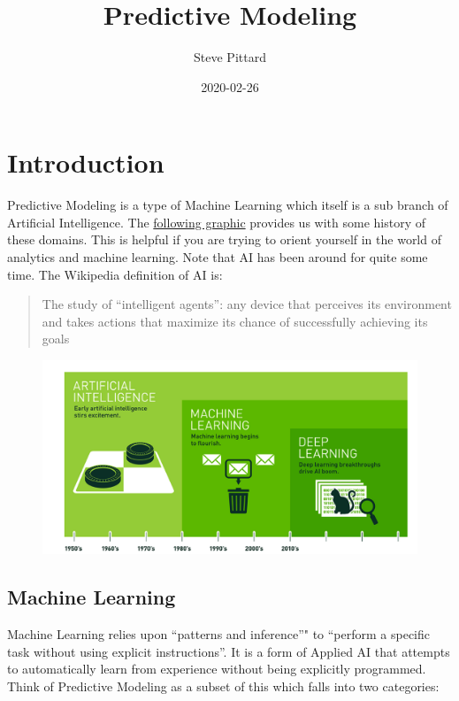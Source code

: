 \documentclass[]{book}
\title{Predictive Modeling}
\author{Steve Pittard}
\date{2020-02-26}
\begin{document}
\maketitle

{
\setcounter{tocdepth}{1}
\tableofcontents
}
\chapter{Introduction}\label{intro}

Predictive Modeling is a type of Machine Learning which itself is a sub
branch of Artificial Intelligence. The
\href{https://blogs.nvidia.com/blog/2016/07/29/whats-difference-artificial-intelligence-machine-learning-deep-learning-ai/}{following
graphic} provides us with some history of these domains. This is helpful
if you are trying to orient yourself in the world of analytics and
machine learning. Note that AI has been around for quite some time. The
Wikipedia definition of AI is:

\begin{quote}
The study of ``intelligent agents'': any device that perceives its
environment and takes actions that maximize its chance of successfully
achieving its goals
\end{quote}

\begin{figure}
\centering
\includegraphics{./PICS/histofai.png}
\caption{}
\end{figure}

\section{Machine Learning}\label{machine-learning}

Machine Learning relies upon ``patterns and inference''" to ``perform a
specific task without using explicit instructions''. It is a form of
Applied AI that attempts to automatically learn from experience without
being explicitly programmed. Think of Predictive Modeling as a subset of
this which falls into two categories:
\end{document}
